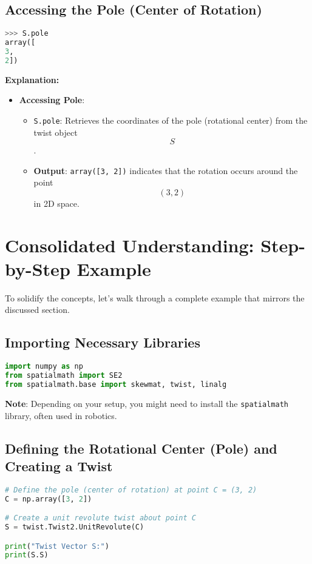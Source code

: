 \documentclass[12pt]{article}
\begin{document}
\subsection{Accessing the Pole (Center of Rotation)}

\begin{lstlisting}[language=Python]
>>> S.pole
array([
3,
2])
\end{lstlisting}

\textbf{Explanation:}

\begin{itemize}
    \item \textbf{Accessing Pole}:
        \begin{itemize}
            \item \texttt{S.pole}: Retrieves the coordinates of the pole (rotational center) from the twist object $$ S $$.
            \item \textbf{Output}: \texttt{array([3, 2])} indicates that the rotation occurs around the point $$ (3, 2) $$ in 2D space.
        \end{itemize}
\end{itemize}

\section{Consolidated Understanding: Step-by-Step Example}

To solidify the concepts, let's walk through a complete example that mirrors the discussed section.

\subsection{Importing Necessary Libraries}

\begin{lstlisting}[language=Python]
import numpy as np
from spatialmath import SE2
from spatialmath.base import skewmat, twist, linalg
\end{lstlisting}

\textbf{Note}: Depending on your setup, you might need to install the \texttt{spatialmath} library, often used in robotics.

\subsection{Defining the Rotational Center (Pole) and Creating a Twist}

\begin{lstlisting}[language=Python]
# Define the pole (center of rotation) at point C = (3, 2)
C = np.array([3, 2])

# Create a unit revolute twist about point C
S = twist.Twist2.UnitRevolute(C)

print("Twist Vector S:")
print(S.S)
\end{lstlisting}
\end{document}
